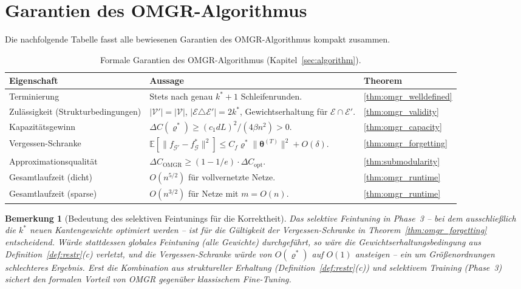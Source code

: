 \documentclass[12pt, a4paper, openany]{report}
\newtheorem{remark}[theorem]{Bemerkung}
\newcommand{\E}{\mathbb{E}}
\newcommand{\calG}{\mathcal{G}}
\newcommand{\calV}{\mathcal{V}}
\newcommand{\calE}{\mathcal{E}}
\begin{document}
\section{Garantien des OMGR-Algorithmus}
\label{sec:algo_summary}

Die nachfolgende Tabelle fasst alle bewiesenen Garantien des OMGR-Algorithmus
kompakt zusammen.

\begin{table}[H]
\centering
\caption{Formale Garantien des OMGR-Algorithmus (Kapitel~\ref{sec:algorithm}).}
\label{tab:omgr_guarantees}
\renewcommand{\arraystretch}{1.35}
\begin{tabularx}{\linewidth}{@{}l X l@{}}
\toprule
\textbf{Eigenschaft} & \textbf{Aussage} & \textbf{Theorem} \\
\midrule
Terminierung
  & Stets nach genau $k^* + 1$ Schleifenrunden.
  & \ref{thm:omgr_welldefined} \\
Zulässigkeit (Strukturbedingungen)
  & $|\calV'|=|\calV|$, $|\calE\triangle\calE'|=2k^*$,
    Gewichtserhaltung für $\calE\cap\calE'$.
  & \ref{thm:omgr_validity} \\
Kapazitätsgewinn
  & $\Delta C(\varrho^*) \geq (c_1 dL)^2/(4\beta n^2) > 0$.
  & \ref{thm:omgr_capacity} \\
Vergessen-Schranke
  & $\E[\|f_{\calG'}-f^*_\calG\|^2] \leq C_f\varrho^*\|\bm\theta^{(T)}\|^2+O(\delta)$.
  & \ref{thm:omgr_forgetting} \\
Approximationsqualität
  & $\Delta C_{\mathrm{OMGR}} \geq (1-1/e)\cdot\Delta C_{\mathrm{opt}}$.
  & \ref{thm:submodularity} \\
Gesamtlaufzeit (dicht)
  & $O(n^{5/2})$ für vollvernetzte Netze.
  & \ref{thm:omgr_runtime} \\
Gesamtlaufzeit (sparse)
  & $O(n^{3/2})$ für Netze mit $m = O(n)$.
  & \ref{thm:omgr_runtime} \\
\bottomrule
\end{tabularx}
\end{table}

\begin{remark}[Bedeutung des selektiven Feintunings für die Korrektheit]
\label{rem:selective_finetuning}
Das selektive Feintuning in Phase~3 -- bei dem ausschließlich die $k^*$
neuen Kantengewichte optimiert werden -- ist für die Gültigkeit der
Vergessen-Schranke in Theorem~\ref{thm:omgr_forgetting} \emph{entscheidend}.
Würde stattdessen globales Feintuning (alle Gewichte) durchgeführt,
so wäre die Gewichtserhaltungsbedingung aus Definition~\ref{def:restr}(c)
verletzt, und die Vergessen-Schranke würde von $O(\varrho^*)$ auf $O(1)$
ansteigen -- ein um Größenordnungen schlechteres Ergebnis.  Erst die
Kombination aus struktureller Erhaltung (Definition~\ref{def:restr}(c))
und selektivem Training (Phase~3) sichert den formalen Vorteil von OMGR
gegenüber klassischem Fine-Tuning.
\end{remark}
\end{document}
